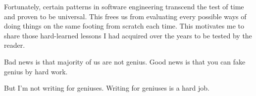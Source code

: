 Fortunately, certain patterns in software engineering transcend the test of time and proven to be
universal.
This frees us from evaluating every possible ways of doing things on the same footing from
scratch each time.
This motivates me to share those hard-learned lessons I had acquired over the years to be tested
by the reader.

Bad news is that majority of us are not genius.
Good news is that you can fake genius by hard work.

But I'm not writing for geniuses.
Writing for geniuses is a hard job.

